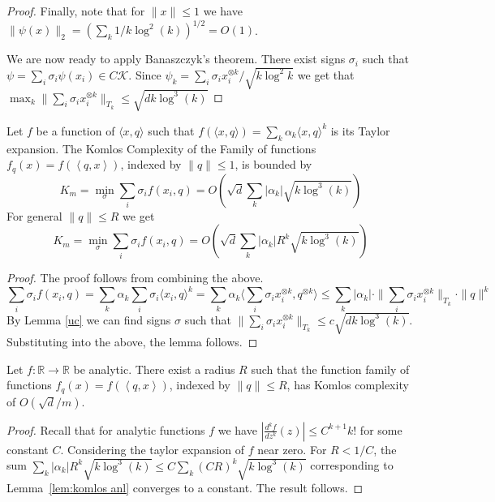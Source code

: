 \documentclass[anon,12pt]{colt2019} %
\newcommand{\ip}[1]{\left \langle #1 \right \rangle}
\newcommand{\R}{\mathbb{R}}
\begin{document}
\begin{proof}
Finally, note that for $\|x\| \le 1$ we have $\|\psi(x)\|_2 = (\sum_k  1/k\log^2(k))^{1/2} = O(1)$.


We are now ready to apply Banaszczyk's theorem. 
There exist signs $\sigma_i$ such that $\psi  = \sum_i \sigma_i \psi(x_i) \in C \mathcal K$.
Since $\psi_k = \sum_i \sigma_i x_i^{\otimes k}/\sqrt{k \log^2{k}}$ we get that $\max_k \|\sum_i \sigma_i  x_i^{\otimes k}\|_{T_k} \le \sqrt{d k \log^{3}(k)}$
\end{proof}

\begin{lemma} \label{lem:komlos anl}
Let $f$ be a function of $\langle x,q\rangle$ such that $f(\langle x,q\rangle) = \sum_k \alpha_k \langle x,q\rangle^k$ is its Taylor expansion. The Komlos Complexity of the Family of functions $f_q(x) = f(\ip{q,x})$, indexed by $\|q\| \leq 1$, is bounded by
\[
K_m = \min_\sigma \sum_i \sigma_i f(x_i,q) =O\left( \sqrt{d} \sum_k  |\alpha_k|\sqrt{k\log^3(k)}\right)
\]
For general $\|q\| \leq R$ we get
\[
K_m = \min_\sigma \sum_i \sigma_i f(x_i,q) =O\left( \sqrt{d} \sum_k  |\alpha_k| R^k \sqrt{ k\log^3(k)}\right)
\]
\end{lemma}
\begin{proof}
The proof follows from combining the above.
$$
\sum_i \sigma_i f(x_i,q) = \sum_k \alpha_k \sum_i \sigma_i \langle x_i,q\rangle^k =  \sum_k \alpha_k  \langle  \sum_i \sigma_i x_i^{\otimes k},q^{\otimes k}\rangle \le \sum_k |\alpha_k| \cdot \| \sum_i \sigma_i x_i^{\otimes k}\|_{T_k} \cdot \|q\|^k
$$
By Lemma \ref{uc} we can find signs $\sigma$ such that 
$\| \sum_i \sigma_i x_i^{\otimes k}\|_{T_k} \le c\sqrt{d k \log^3(k)}$. Substituting into the above, the lemma follows.
\end{proof}

\begin{theorem}\label{analitic1}
Let $f:\R\rightarrow\R$ be analytic. There exist a radius $R$ such that the function family of functions $f_q(x) = f(\ip{q,x})$, indexed by $\|q\| \leq R$, has Komlos complexity of $O(\sqrt{d}/m)$. 
\end{theorem}
\begin{proof}
Recall that for analytic functions $f$ we have $\left| \frac{d^k f}{dz^k}(z) \right|  \leq C^{k+1} k! $
for some constant $C$. Considering the taylor expansion of $f$ near zero. For $R < 1/C$, the sum
$ \sum_k  |\alpha_k| R^k \sqrt{ k\log^3(k)} \leq C \sum_k  (CR)^k \sqrt{ k\log^3(k)}$
corresponding to Lemma~\ref{lem:komlos anl} converges to a constant. The result follows.
\end{proof}
\end{document}
